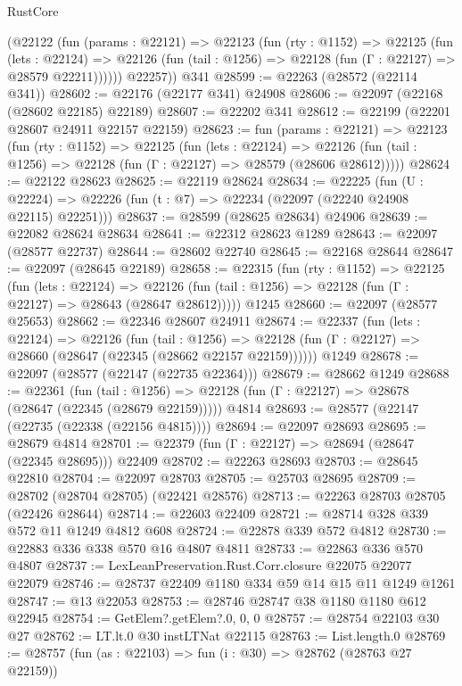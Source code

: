 \begin{lexlean}{RustCore}
\begin{coremodule}
        (@22122
          (fun (params : @22121) =>
          @22123
            (fun (rty : @1152) =>
            @22125
              (fun (lets : @22124) =>
              @22126 (fun (tail : @1256) => @22128 (fun (Γ : @22127) => @28579 @22211))))))
        @22257))
    @341
@28599 := @22263 (@28572 (@22114 @341))
@28602 := @22176 (@22177 @341) @24908
@28606 := @22097 (@22168 (@28602 @22185) @22189)
@28607 := @22202 @341
@28612 := @22199 (@22201 @28607 @24911 @22157 @22159)
@28623 := fun (params : @22121) =>
  @22123
    (fun (rty : @1152) =>
    @22125
      (fun (lets : @22124) =>
      @22126 (fun (tail : @1256) => @22128 (fun (Γ : @22127) => @28579 (@28606 @28612)))))
@28624 := @22122 @28623
@28625 := @22119 @28624
@28634 := @22225
    (fun (U : @22224) => @22226 (fun (t : @7) => @22234 (@22097 (@22240 @24908 @22115) @22251)))
@28637 := @28599 (@28625 @28634) @24906
@28639 := @22082 @28624 @28634
@28641 := @22312 @28623 @1289
@28643 := @22097 (@28577 @22737)
@28644 := @28602 @22740
@28645 := @22168 @28644
@28647 := @22097 (@28645 @22189)
@28658 := @22315
    (fun (rty : @1152) =>
    @22125
      (fun (lets : @22124) =>
      @22126 (fun (tail : @1256) => @22128 (fun (Γ : @22127) => @28643 (@28647 @28612)))))
    @1245
@28660 := @22097 (@28577 @25653)
@28662 := @22346 @28607 @24911
@28674 := @22337
    (fun (lets : @22124) =>
    @22126
      (fun (tail : @1256) =>
      @22128 (fun (Γ : @22127) => @28660 (@28647 (@22345 (@28662 @22157 @22159))))))
    @1249
@28678 := @22097 (@28577 (@22147 (@22735 @22364)))
@28679 := @28662 @1249
@28688 := @22361
    (fun (tail : @1256) => @22128 (fun (Γ : @22127) => @28678 (@28647 (@22345 (@28679 @22159)))))
    @4814
@28693 := @28577 (@22147 (@22735 (@22338 (@22156 @4815))))
@28694 := @22097 @28693
@28695 := @28679 @4814
@28701 := @22379 (fun (Γ : @22127) => @28694 (@28647 (@22345 @28695))) @22409
@28702 := @22263 @28693
@28703 := @28645 @22810
@28704 := @22097 @28703
@28705 := @25703 @28695
@28709 := @28702 (@28704 @28705) (@22421 @28576)
@28713 := @22263 @28703 @28705 (@22426 @28644)
@28714 := @22603 @22409
@28721 := @28714 @328 @339 @572 @11 @1249 @4812 @608
@28724 := @22878 @339 @572 @4812
@28730 := @22883 @336 @338 @570 @16 @4807 @4811
@28733 := @22863 @336 @570 @4807
@28737 := LexLeanPreservation.Rust.Corr.closure @22075 @22077 @22079
@28746 := @28737 @22409 @1180 @334 @59 @14 @15 @11 @1249 @1261
@28747 := @13 @22053
@28753 := @28746 @28747 @38 @1180 @1180 @612 @22945
@28754 := GetElem?.getElem?.{0, 0, 0}
@28757 := @28754 @22103 @30 @27
@28762 := LT.lt.{0} @30 instLTNat @22115
@28763 := List.length.{0}
@28769 := @28757 (fun (as : @22103) => fun (i : @30) => @28762 (@28763 @27 @22159))

\end{coremodule}
\end{lexlean}
